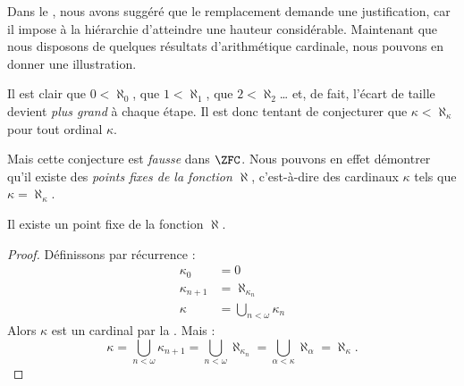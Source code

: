 \documentclass[../../../include/open-logic-section]{subfiles}
\begin{document}

Dans le , nous avons suggéré
que le remplacement demande une justification,
car il impose à la hiérarchie d'atteindre une
hauteur considérable. Maintenant que nous
disposons de quelques résultats d'arithmétique
cardinale, nous pouvons en donner une illustration.

Il est clair que $0 < \aleph_0$, que
$1 < \aleph_1$, que $2 < \aleph_2$\ldots
et, de fait, l'écart de taille devient
\emph{plus grand} à chaque étape.
Il est donc tentant de conjecturer que
$\kappa< \aleph_\kappa$ pour tout ordinal
$\kappa$.

Mais cette conjecture est \emph{fausse}
dans $\ZFC$. Nous pouvons en effet démontrer
qu'il existe des \emph{points fixes de la
fonction $\aleph$}, c'est-à-dire des cardinaux
$\kappa$ tels que $\kappa=\aleph_\kappa$.

\begin{prop}
Il existe un point fixe de la fonction $\aleph$.
\end{prop}

\begin{proof}
Définissons par récurrence :
\begin{align*}
	\kappa_0 &= 0\\
	\kappa_{n+1} &= \aleph_{\kappa_n}\\
	\kappa&= \bigcup_{n < \omega}\kappa_n
\end{align*}
Alors $\kappa$ est un cardinal par la
.
Mais :
\[
	\kappa= \bigcup_{n < \omega} \kappa_{n+1} =
	\bigcup_{n < \omega}\aleph_{\kappa_n} =
	\bigcup_{\alpha < \kappa}\aleph_\alpha
	= \aleph_\kappa.
\]
\end{proof}
\end{document}
